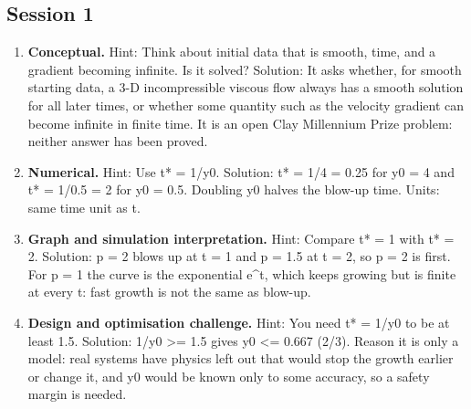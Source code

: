 \documentclass[11pt,a4paper]{article}
\begin{document}
\subsection*{Session 1}
\begin{enumerate}[nosep]
\item \textbf{Conceptual.} Hint: Think about initial data that is smooth, time, and a gradient becoming infinite. Is it solved? Solution: It asks whether, for smooth starting data, a 3-D incompressible viscous flow always has a smooth solution for all later times, or whether some quantity such as the velocity gradient can become infinite in finite time. It is an open Clay Millennium Prize problem: neither answer has been proved.
\item \textbf{Numerical.} Hint: Use t* = 1/y0. Solution: t* = 1/4 = 0.25 for y0 = 4 and t* = 1/0.5 = 2 for y0 = 0.5. Doubling y0 halves the blow-up time. Units: same time unit as t.
\item \textbf{Graph and simulation interpretation.} Hint: Compare t* = 1 with t* = 2. Solution: p = 2 blows up at t = 1 and p = 1.5 at t = 2, so p = 2 is first. For p = 1 the curve is the exponential e\textasciicircum{}t, which keeps growing but is finite at every t: fast growth is not the same as blow-up.
\item \textbf{Design and optimisation challenge.} Hint: You need t* = 1/y0 to be at least 1.5. Solution: 1/y0 \textgreater{}= 1.5 gives y0 \textless{}= 0.667 (2/3). Reason it is only a model: real systems have physics left out that would stop the growth earlier or change it, and y0 would be known only to some accuracy, so a safety margin is needed.
\end{enumerate}
\end{document}
